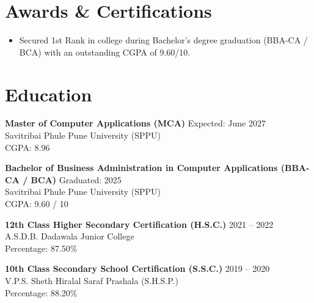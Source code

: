 \documentclass[a4paper,10pt]{article}
\begin{document}
    \section*{Awards \& Certifications}

    \begin{itemize}[leftmargin=*]
        \item Secured 1st Rank in college during Bachelor's degree graduation (BBA-CA / BCA) with an outstanding CGPA of 9.60/10.
    \end{itemize}

    \section*{Education}

    \textbf{Master of Computer Applications (MCA)} \hfill Expected: June 2027\\
    Savitribai Phule Pune University (SPPU)\\
    CGPA: 8.96 

    \vspace{4pt} 

    \textbf{Bachelor of Business Administration in Computer Applications (BBA-CA / BCA)} \hfill Graduated: 2025\\
    Savitribai Phule Pune University (SPPU)\\
    CGPA: 9.60 / 10

    \vspace{4pt} 

    \textbf{12th Class Higher Secondary Certification (H.S.C.)} \hfill 2021 -- 2022\\
    A.S.D.B. Dadawala Junior College\\
    Percentage: 87.50\%

    \vspace{4pt} 

    \textbf{10th Class Secondary School Certification (S.S.C.)} \hfill 2019 -- 2020\\
    V.P.S. Sheth Hiralal Saraf Prashala (S.H.S.P.)\\
    Percentage: 88.20\%

    
\end{document}
